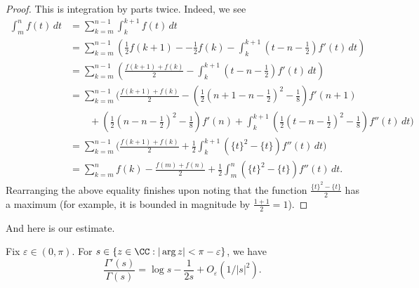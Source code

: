 \documentclass[../notes.tex]{subfiles}
\begin{document}
\begin{proof}
	This is integration by parts twice. Indeed, we see
	\begin{align*}
		\int_m^nf(t)\,dt &= \sum_{k=m}^{n-1}\int_k^{k+1}f(t)\,dt \\
		&= \sum_{k=m}^{n-1}\left(\frac12f(k+1)--\frac12f(k)-\int_k^{k+1}\left(t-n-\frac12\right)f'(t)\,dt\right) \\
		&= \sum_{k=m}^{n-1}\left(\frac{f(k+1)+f(k)}2-\int_k^{k+1}\left(t-n-\frac12\right)f'(t)\,dt\right) \\
		&= \sum_{k=m}^{n-1}\Bigg(\frac{f(k+1)+f(k)}2-\left(\frac12\left(n+1-n-\frac12\right)^2-\frac18\right)f'(n+1) \\
		&\qquad+\left(\frac12\left(n-n-\frac12\right)^2-\frac18\right)f'(n)+\int_k^{k+1}\left(\frac12\left(t-n-\frac12\right)^2-\frac18\right)f''(t)\,dt\Bigg) \\
		&= \sum_{k=m}^{n-1}\Bigg(\frac{f(k+1)+f(k)}2+\frac12\int_k^{k+1}\left(\{t\}^2-\{t\}\right)f''(t)\,dt\Bigg) \\
		&= \sum_{k=m}^nf(k)-\frac{f(m)+f(n)}2+\frac12\int_m^n\left(\{t\}^2-\{t\}\right)f''(t)\,dt.
	\end{align*}
	Rearranging the above equality finishes upon noting that the function $\frac{\{t\}^2-\{t\}}2$ has a maximum (for example, it is bounded in magnitude by $\frac{1+1}2=1$).
\end{proof}
And here is our estimate.
\begin{proposition} \label{prop:bound-digamma}
	Fix $\varepsilon\in(0,\pi)$. For $s\in\{z\in\CC:|\arg z|<\pi-\varepsilon\}$, we have
	\[\frac{\Gamma'(s)}{\Gamma(s)}=\log s-\frac1{2s}+O_\varepsilon\left(1/|s|^2\right).\]
\end{proposition}
\end{document}
